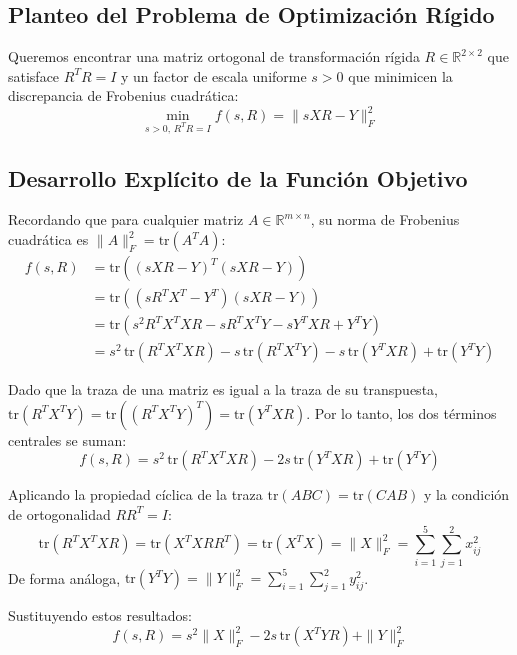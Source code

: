 \documentclass[11pt,a4paper,openany]{book}
\theoremstyle{definition}
\begin{document}
\subsection{Planteo del Problema de Optimización Rígido}
Queremos encontrar una matriz ortogonal de transformación rígida $R \in \mathbb{R}^{2 \times 2}$ que satisface $R^T R = I$ y un factor de escala uniforme $s > 0$ que minimicen la discrepancia de Frobenius cuadrática:
\begin{equation}
\min_{s > 0, \, R^T R = I} f(s, R) = \| s X R - Y \|_F^2
\label{eq:problema_procrustes}
\end{equation}

\subsection{Desarrollo Explícito de la Función Objetivo}
Recordando que para cualquier matriz $A \in \mathbb{R}^{m \times n}$, su norma de Frobenius cuadrática es $\|A\|_F^2 = \text{tr}(A^T A)$:
\begin{align}
f(s, R) &= \text{tr}\left( (s X R - Y)^T (s X R - Y) \right) \nonumber \\
&= \text{tr}\left( (s R^T X^T - Y^T)(s X R - Y) \right) \nonumber \\
&= \text{tr}\left( s^2 R^T X^T X R - s R^T X^T Y - s Y^T X R + Y^T Y \right) \nonumber \\
&= s^2 \, \text{tr}(R^T X^T X R) - s \, \text{tr}(R^T X^T Y) - s \, \text{tr}(Y^T X R) + \text{tr}(Y^T Y)
\end{align}

Dado que la traza de una matriz es igual a la traza de su transpuesta, $\text{tr}(R^T X^T Y) = \text{tr}((R^T X^T Y)^T) = \text{tr}(Y^T X R)$. Por lo tanto, los dos términos centrales se suman:
$$f(s, R) = s^2 \, \text{tr}(R^T X^T X R) - 2s \, \text{tr}(Y^T X R) + \text{tr}(Y^T Y)$$

Aplicando la propiedad cíclica de la traza $\text{tr}(A B C) = \text{tr}(C A B)$ y la condición de ortogonalidad $R R^T = I$:
$$\text{tr}(R^T X^T X R) = \text{tr}(X^T X R R^T) = \text{tr}(X^T X) = \|X\|_F^2 = \sum_{i=1}^5 \sum_{j=1}^2 x_{ij}^2$$
De forma análoga, $\text{tr}(Y^T Y) = \|Y\|_F^2 = \sum_{i=1}^5 \sum_{j=1}^2 y_{ij}^2$.

Sustituyendo estos resultados:
\begin{equation}
f(s, R) = s^2 \|X\|_F^2 - 2s \, \text{tr}(X^T Y R) + \|Y\|_F^2
\label{eq:f_expandida}
\end{equation}
\end{document}
